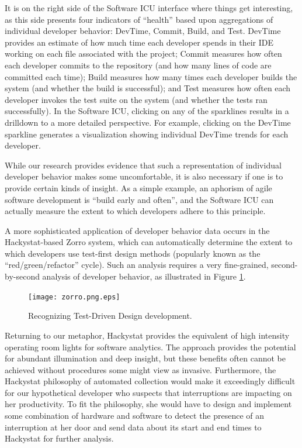 \documentclass[]{article}
\begin{document}
It is on the right side of the Software ICU interface where things get interesting, as
this side presents four indicators of ``health'' based upon aggregations of individual
developer behavior: DevTime, Commit, Build, and Test.  DevTime provides an estimate of how
much time each developer spends in their IDE working on each file associated with the
project; Commit measures how often each developer commits to the repository (and how many
lines of code are committed each time); Build measures how many times each developer
builds the system (and whether the build is successful); and Test measures how often each
developer invokes the test suite on the system (and whether the tests ran successfully).
In the Software ICU, clicking on any of the sparklines results in a drilldown to a more
detailed perspective. For example, clicking on the DevTime sparkline generates a
visualization showing individual DevTime trends for each developer.

While our research provides evidence that such a representation of individual developer
behavior makes some uncomfortable, it is also necessary if one is to provide certain kinds
of insight.  As a simple example, an aphorism of agile software development is ``build
early and often'', and the Software ICU can actually measure the extent to which
developers adhere to this principle.  

A more sophisticated application of developer behavior data occurs in the Hackystat-based
Zorro system, which can automatically determine the extent to which developers use
test-first design methods (popularly known as the ``red/green/refactor'' cycle).  Such an
analysis requires a very fine-grained, second-by-second analysis of developer behavior, as
illustrated in Figure \ref{fig:zorro}.

\begin{figure}[!tb]
\centering
\texttt{[image: zorro.png.eps]}
\caption{Recognizing Test-Driven Design development.}
\label{fig:zorro}
\end{figure}

Returning to our metaphor, Hackystat provides the equivalent of high intensity operating
room lights for software analytics. The approach provides the potential for abundant
illumination and deep insight, but these benefits often cannot be achieved without
procedures some might view as invasive.  Furthermore, the Hackystat philosophy of
automated collection would make it exceedingly difficult for our hypothetical
developer who suspects that interruptions are impacting on her productivity.  To fit 
the philosophy, she would have to design and implement some combination of hardware and
software to detect the presence of an interruption at her door and send data about its
start and end times to Hackystat for further analysis.
\end{document}
